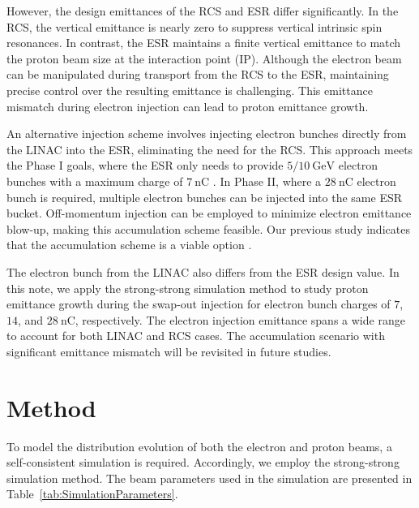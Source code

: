 \documentclass{article}
\begin{document}
However, the design emittances of the RCS and ESR differ significantly. 
In the RCS, the vertical emittance is nearly zero to suppress vertical intrinsic 
spin resonances. In contrast, the ESR maintains a finite vertical emittance to 
match the proton beam size at the interaction point (IP). 
Although the electron beam can be manipulated during transport from the RCS to 
the ESR, maintaining precise control over the resulting emittance is challenging.
This emittance mismatch during electron injection can lead to proton emittance growth.

An alternative injection scheme involves injecting electron bunches directly from the 
LINAC into the ESR, eliminating the need for the RCS. This approach meets the Phase I 
goals, where the ESR only needs to provide $5/10~\mathrm{GeV}$ electron bunches with 
a maximum charge of $7~\mathrm{nC}$ \cite{EICMACReview202409:Sergei} . In Phase II, where a $28~\mathrm{nC}$ electron 
bunch is required, multiple electron bunches can be injected into the same ESR bucket. 
Off-momentum injection can be employed to minimize electron emittance blow-up, 
making this accumulation scheme feasible. Our previous study indicates that 
the accumulation scheme is a viable option \cite{xu:ipac2024-mopc72}.

The electron bunch from the LINAC also differs from the ESR design value. 
In this note, we apply the strong-strong simulation method to study proton 
emittance growth during the swap-out injection for electron bunch charges of $7$, 
$14$, and $28~\mathrm{nC}$, respectively. The electron injection emittance spans 
a wide range to account for both LINAC and RCS cases. The accumulation scenario 
with significant emittance mismatch will be revisited in future studies.
\section{Method}
To model the distribution evolution of both the electron and proton beams, 
a self-consistent simulation is required. Accordingly, we employ 
the strong-strong simulation method. The beam parameters used in the simulation 
are presented in Table~\ref{tab:SimulationParameters}. 
\end{document}
